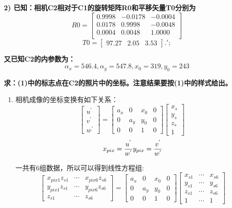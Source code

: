 \documentclass[]{article}
\begin{document}
\textbf{2) 已知：相机C2相对于C1的旋转矩阵R0和平移矢量T0分别为}
$$
R0 = \begin{bmatrix} 0.9998 &  -0.0178 &  -0.0004\\
0.0178   & 0.9998  & -0.0048\\
0.0004   & 0.0048  &  1.0000\\
\end{bmatrix}
$$
$$
T0 = \begin{bmatrix}97.27 & 2.05 & 3.53\end{bmatrix}.';
$$

\textbf{又已知C2的内参数为：}
$$
α_x=546.4,α_y=547.8,x_0=319,y_0=243
$$

\textbf{求：(1)中的标志点在C2的照片中的坐标。注意结果要按(1)中的样式给出。}

\begin{enumerate}
    \item 

相机成像的坐标变换有如下关系：
$$
\begin{bmatrix}u^{'} \\ v^{'} \\ w^{'}\end{bmatrix}=\begin{bmatrix}a_x & 0 & x_0 & 0 \\ 0 & a_y & y_0 & 0 \\ 0 & 0 & 1 & 0 \end{bmatrix} \begin{bmatrix}x_s\\y_s\\z_s\\1\end{bmatrix}\
$$
$$
x_{pix}=\frac{u^{'}}{w^{'}} \\ y_{pix}=\frac{v^{'}}{w^{'}}
$$

一共有6组数据，所以可以得到线性方程组:
$$
\begin{bmatrix}x_{pix1}z_{s1} & \cdots & x_{pix6}z_{s6} \\ y_{pix1}z_{s1} & \cdots & y_{pix6}z_{s6} \\ z_{s1} & \cdots & z_{s6}\end{bmatrix}=\begin{bmatrix}a_x & 0 & x_0 & 0 \\ 0 & a_y & y_0 & 0 \\ 0 & 0 & 1 & 0 \end{bmatrix} \begin{bmatrix}x_{s1} & \cdots & x_{s6}\\y_{s1} & \cdots & y_{s6}\\z_{s1} & \cdots & z_{s6}\\1 & \cdots & 1\end{bmatrix}
$$


\end{enumerate}
\end{document}
